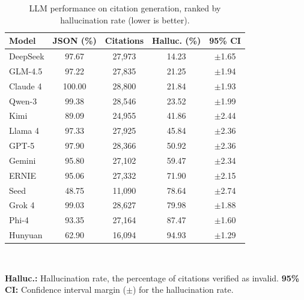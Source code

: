 \begin{table}[t]
    \centering
    \caption{LLM performance on citation generation, ranked by hallucination rate (lower is better).}
    \label{tab:model_validity}
    \footnotesize
    \begin{tabular}{lcccc}
    \toprule
    \textbf{Model} & \cellcolor{blue!8}\textbf{JSON (\%)} & \cellcolor{green!12}\textbf{Citations} & \cellcolor{red!12}\textbf{Halluc. (\%)} & \textbf{95\% CI} \\
    \midrule
    DeepSeek & \cellcolor{blue!12}97.67 & \cellcolor{green!12}27,973 & \cellcolor{red!6}14.23 & $\pm$1.65 \\
    GLM-4.5 & \cellcolor{blue!12}97.22 & \cellcolor{green!12}27,835 & \cellcolor{red!6}21.25 & $\pm$1.94 \\
    Claude 4 & \cellcolor{blue!15}100.00 & \cellcolor{green!14}28,800 & \cellcolor{red!8}21.84 & $\pm$1.93 \\
    Qwen-3 & \cellcolor{blue!12}99.38 & \cellcolor{green!12}28,546 & \cellcolor{red!8}23.52 & $\pm$1.99 \\
    Kimi & \cellcolor{blue!6}89.09 & \cellcolor{green!10}24,955 & \cellcolor{red!12}41.86 & $\pm$2.44 \\
    Llama 4 & \cellcolor{blue!12}97.33 & \cellcolor{green!12}27,925 & \cellcolor{red!14}45.84 & $\pm$2.36 \\
    GPT-5 & \cellcolor{blue!12}97.90 & \cellcolor{green!12}28,366 & \cellcolor{red!16}50.92 & $\pm$2.36 \\
    Gemini & \cellcolor{blue!10}95.80 & \cellcolor{green!10}27,102 & \cellcolor{red!18}59.47 & $\pm$2.34 \\
    ERNIE & \cellcolor{blue!10}95.06 & \cellcolor{green!10}27,332 & \cellcolor{red!20}71.90 & $\pm$2.15 \\
    Seed & \cellcolor{blue!3}48.75 & \cellcolor{green!6}11,090 & \cellcolor{red!22}78.64 & $\pm$2.74 \\
    Grok 4 & \cellcolor{blue!12}99.03 & \cellcolor{green!12}28,627 & \cellcolor{red!24}79.98 & $\pm$1.88 \\
    Phi-4 & \cellcolor{blue!8}93.35 & \cellcolor{green!10}27,164 & \cellcolor{red!26}87.47 & $\pm$1.60 \\
    Hunyuan & \cellcolor{blue!3}62.90 & \cellcolor{green!8}16,094 & \cellcolor{red!28}94.93 & $\pm$1.29 \\
    \bottomrule
    \end{tabular}\\[0.5em]
    \raggedright\footnotesize\colorbox{red!15}{\textbf{Halluc.:}} Hallucination rate, the percentage of citations verified as invalid. \textbf{95\% CI:} Confidence interval margin ($\pm$) for the hallucination rate.
    \end{table}
